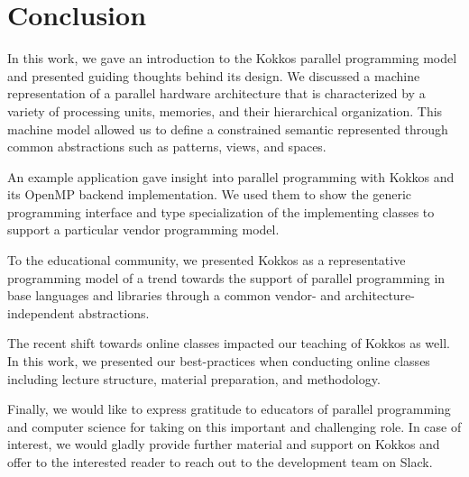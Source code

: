 \section{Conclusion}\label{chap:conclusion}
In this work, we gave an introduction to the Kokkos parallel programming model and presented guiding thoughts behind its design. We discussed a machine representation of a parallel hardware architecture that is characterized by a variety of processing units, memories, and their hierarchical organization. This machine model allowed us to define a constrained semantic represented through common abstractions such as patterns, views, and spaces. 

An example application gave insight into parallel programming with Kokkos and its OpenMP backend implementation. We used them to show the generic programming interface and type specialization of the implementing classes to support a particular vendor programming model.

To the educational community, we presented Kokkos as a representative programming model of a trend towards the support of parallel programming in base languages and libraries through a common vendor- and architecture-independent abstractions.

The recent shift towards online classes impacted our teaching of Kokkos as well. In this work, we presented our best-practices when conducting online classes including lecture structure, material preparation, and methodology. 

Finally, we would like to express gratitude to educators of parallel programming and computer science for taking on this important and challenging role. In case of interest, we would gladly provide further material and support on Kokkos and offer to the interested reader to reach out to the development team on Slack\cite{KOKKOS_SLACK}.
